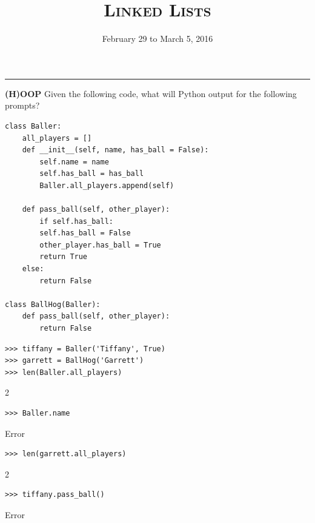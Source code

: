 \documentclass{exam}
\title{\textsc{Linked Lists}}
\date{February 29 to March 5, 2016}
\begin{document}
\maketitle
\rule{\textwidth}{0.15em}
\fontsize{12}{15}\selectfont




\begin{questions}
\begin{blocksection}
\question \textbf{(H)OOP} \newline
Given the following code, what will Python output for the following prompts? 

\begin{lstlisting}
class Baller:
	all_players = []
	def __init__(self, name, has_ball = False):
		self.name = name
		self.has_ball = has_ball
		Baller.all_players.append(self)
	
	def pass_ball(self, other_player):
		if self.has_ball:
		self.has_ball = False
		other_player.has_ball = True
		return True
	else:
		return False

class BallHog(Baller):
	def pass_ball(self, other_player):	
		return False	
\end{lstlisting}

\begin{lstlisting}
>>> tiffany = Baller('Tiffany', True)
>>> garrett = BallHog('Garrett')
>>> len(Baller.all_players)
\end{lstlisting}
\begin{solution}[.2in]
2
\end{solution}
\end{blocksection}

\begin{blocksection}
\begin{lstlisting}
>>> Baller.name
\end{lstlisting}
\begin{solution}[.2in]
Error
\end{solution}

\begin{lstlisting}
>>> len(garrett.all_players)
\end{lstlisting}
\begin{solution}[.2in]
2
\end{solution}

\begin{lstlisting}
>>> tiffany.pass_ball()
\end{lstlisting}
\begin{solution}[.2in]
Error
\end{solution}


\end{blocksection}
\end{questions}
\end{document}
